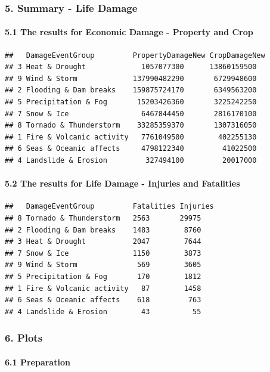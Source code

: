 \documentclass[]{article}
\let\oldparagraph\paragraph
\renewcommand{\paragraph}[1]{\oldparagraph{#1}\mbox{}}
\begin{document}
\subsubsection{5. Summary - Life Damage}\label{summary---life-damage}

\paragraph{5.1 The results for Economic Damage - Property and
Crop}\label{the-results-for-economic-damage---property-and-crop}

\begin{verbatim}
##   DamageEventGroup         PropertyDamageNew CropDamageNew
## 3 Heat & Drought             1057077300      13860159500  
## 9 Wind & Storm             137990482290       6729948600  
## 2 Flooding & Dam breaks    159875724170       6349563200  
## 5 Precipitation & Fog       15203426360       3225242250  
## 7 Snow & Ice                 6467844450       2816170100  
## 8 Tornado & Thunderstorm    33285359370       1307316050  
## 1 Fire & Volcanic activity   7761049500        402255130  
## 6 Seas & Oceanic affects     4798122340         41022500  
## 4 Landslide & Erosion         327494100         20017000
\end{verbatim}

\paragraph{5.2 The results for Life Damage - Injuries and
Fatalities}\label{the-results-for-life-damage---injuries-and-fatalities}

\begin{verbatim}
##   DamageEventGroup         Fatalities Injuries
## 8 Tornado & Thunderstorm   2563       29975   
## 2 Flooding & Dam breaks    1483        8760   
## 3 Heat & Drought           2047        7644   
## 7 Snow & Ice               1150        3873   
## 9 Wind & Storm              569        3605   
## 5 Precipitation & Fog       170        1812   
## 1 Fire & Volcanic activity   87        1458   
## 6 Seas & Oceanic affects    618         763   
## 4 Landslide & Erosion        43          55
\end{verbatim}

\subsubsection{6. Plots}\label{plots}

\paragraph{6.1 Preparation}\label{preparation}
\end{document}
